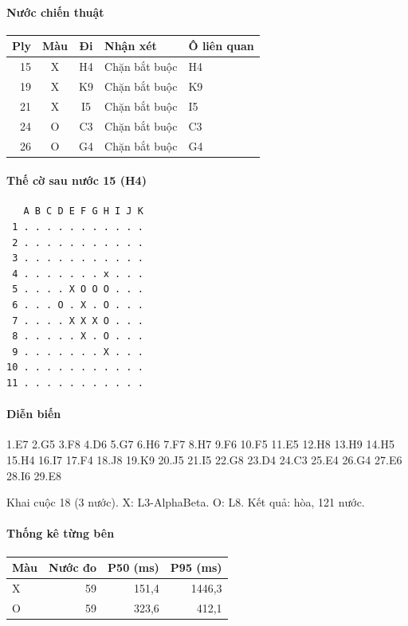 \paragraph{Nước chiến thuật}
\begin{center}\small
\begin{tabular}{@{}rccll@{}}
\toprule
Ply & Màu & Đi & Nhận xét & Ô liên quan \\
\midrule
15 & X & H4 & Chặn bắt buộc & H4 \\
19 & X & K9 & Chặn bắt buộc & K9 \\
21 & X & I5 & Chặn bắt buộc & I5 \\
24 & O & C3 & Chặn bắt buộc & C3 \\
26 & O & G4 & Chặn bắt buộc & G4 \\
\bottomrule
\end{tabular}
\end{center}
\paragraph{Thế cờ sau nước 15 (H4)}
\begin{verbatim}
   A B C D E F G H I J K
 1 . . . . . . . . . . .
 2 . . . . . . . . . . .
 3 . . . . . . . . . . .
 4 . . . . . . . x . . .
 5 . . . . X O O O . . .
 6 . . . O . X . O . . .
 7 . . . . X X X O . . .
 8 . . . . . X . O . . .
 9 . . . . . . . X . . .
10 . . . . . . . . . . .
11 . . . . . . . . . . .
\end{verbatim}
\paragraph{Diễn biến}
{\footnotesize 1.E7 2.G5 3.F8 4.D6 5.G7 6.H6 7.F7 8.H7 9.F6 10.F5 11.E5 12.H8 13.H9 14.H5 15.H4 16.I7 17.F4 18.J8 19.K9 20.J5 21.I5 22.G8 23.D4 24.C3 25.E4 26.G4 27.E6 28.I6 29.E8\par}
Khai cuộc 18 (3 nước). X: L3-AlphaBeta. O: L8. Kết quả: hòa, 121 nước.
\paragraph{Thống kê từng bên}
\begin{center}\small
\begin{tabular}{@{}lrrr@{}}
\toprule
Màu & Nước đo & P50 (ms) & P95 (ms) \\
\midrule
X & 59 & 151,4 & 1446,3 \\
O & 59 & 323,6 & 412,1 \\
\bottomrule
\end{tabular}
\end{center}

